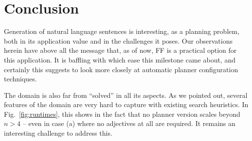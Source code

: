 
\section{Conclusion} \label{sec:conclusion}


Generation of natural language sentences is interesting, as a planning
problem, both in its application value and in the challenges it
poses. Our observations herein have above all the message that, as of
now, FF is a practical option for this application. It is baffling
with which ease this milestone came about, and certainly this suggests
to look more closely at automatic planner configuration techniques.

The domain is also far from ``solved'' in all its aspects. As we
pointed out, several features of the domain are very hard to capture
with existing search heuristics. In Fig.~\ref{fig:runtimes}, this
shows in the fact that no planner version scales beyond $n>4$ -- even
in case (a) where no adjectives at all are required. It remains an
interesting challenge to address this.






